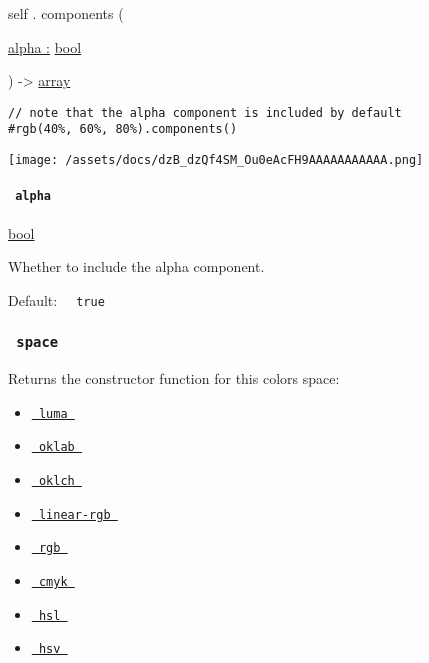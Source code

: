 self { . } { components } (

{ \hyperref[definitions-components-parameters-alpha]{alpha :}
\href{/docs/reference/foundations/bool/}{bool} }

) -\textgreater{} \href{/docs/reference/foundations/array/}{array}

\begin{verbatim}
// note that the alpha component is included by default
#rgb(40%, 60%, 80%).components()
\end{verbatim}

\texttt{[image: /assets/docs/dzB\_dzQf4SM\_Ou0eAcFH9AAAAAAAAAAA.png]}

\paragraph{\texorpdfstring{\texttt{\ alpha\ }}{ alpha }}\label{definitions-components-alpha}

\href{/docs/reference/foundations/bool/}{bool}

Whether to include the alpha component.

Default: \texttt{\ }{\texttt{\ true\ }}\texttt{\ }

\subsubsection{\texorpdfstring{\texttt{\ space\ }}{ space }}\label{definitions-space}

Returns the constructor function for this color\textquotesingle s space:

\begin{itemize}
\tightlist
\item
  \href{/docs/reference/visualize/color/\#definitions-luma}{\texttt{\ luma\ }}
\item
  \href{/docs/reference/visualize/color/\#definitions-oklab}{\texttt{\ oklab\ }}
\item
  \href{/docs/reference/visualize/color/\#definitions-oklch}{\texttt{\ oklch\ }}
\item
  \href{/docs/reference/visualize/color/\#definitions-linear-rgb}{\texttt{\ linear-rgb\ }}
\item
  \href{/docs/reference/visualize/color/\#definitions-rgb}{\texttt{\ rgb\ }}
\item
  \href{/docs/reference/visualize/color/\#definitions-cmyk}{\texttt{\ cmyk\ }}
\item
  \href{/docs/reference/visualize/color/\#definitions-hsl}{\texttt{\ hsl\ }}
\item
  \href{/docs/reference/visualize/color/\#definitions-hsv}{\texttt{\ hsv\ }}
\end{itemize}

